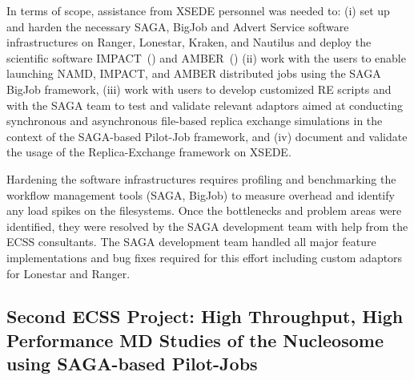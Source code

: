 \documentclass{sig-alternate}
\begin{document}
In terms of scope, assistance from XSEDE personnel was needed to: (i) set up and
harden the necessary SAGA, BigJob and Advert Service software infrastructures on
Ranger, Lonestar, Kraken, and Nautilus and deploy the scientific software
IMPACT~(\cite{IMPACT}) and AMBER~(\cite{AMBER}) (ii) work with the
users to enable launching NAMD, 
IMPACT, and AMBER distributed jobs using the
SAGA BigJob framework, (iii) work with users to develop customized RE scripts
and with the SAGA team to test and validate relevant adaptors aimed at
conducting synchronous and asynchronous ﬁle-based replica exchange simulations
in the context of the SAGA-based Pilot-Job framework, and (iv)  document and
validate the usage of the Replica-Exchange framework on XSEDE.

Hardening the software infrastructures requires profiling and benchmarking the
workflow management tools (SAGA, BigJob) to measure overhead and identify any
load spikes on the filesystems. Once the bottlenecks and problem areas were
identified, they were resolved by the SAGA development team with help from
the ECSS consultants. The SAGA development team handled all major feature
implementations and bug fixes required for this effort including custom
adaptors for Lonestar and Ranger. 

\subsection{Second ECSS Project: High Throughput, High Performance MD Studies of the Nucleosome
using SAGA-based Pilot-Jobs}
\end{document}
